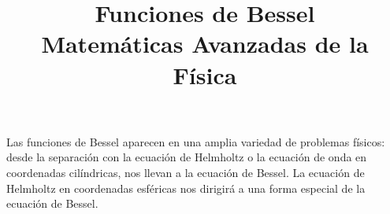 
\usepackage{mathrsfs}
\usepackage{bigints}
\title{Funciones de Bessel \\ {\large Matemáticas Avanzadas de la Física}}
\date{ }

\renewcommand\labelenumii{\theenumi.{\arabic{enumii}}}
\maketitle
\fontsize{14}{14}\selectfont
Las funciones de Bessel aparecen en una amplia variedad de problemas físicos: desde la separación con la ecuación de Helmholtz o la ecuación de onda en coordenadas cilíndricas, nos llevan a la ecuación de Bessel. La ecuación de Helmholtz en coordenadas esféricas nos dirigirá a una forma especial de la ecuación de Bessel.

